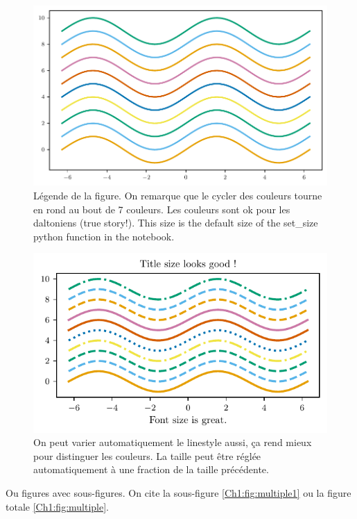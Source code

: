 \begin{figure}
	\centering
	\includegraphics{../Chap1/Figure/Figure_simple_largeur_max.pdf}
	\caption{Légende de la figure. On remarque que le cycler des couleurs tourne en rond au bout de 7 couleurs. Les couleurs sont ok pour les daltoniens (true story!). This size is the default size of the set\_size python function in the notebook.}
	\label{Ch1:fig:simple}
\end{figure}

\begin{figure}
	\centering
	\includegraphics{../Chap1/Figure/Figure_simple_fraction.pdf}
	\caption{On peut varier automatiquement le linestyle aussi, ça rend mieux pour distinguer les couleurs. La taille peut être réglée automatiquement à une fraction de la taille précédente.}
	\label{Ch1:fig:simple frac}
\end{figure}

Ou figures avec sous-figures. On cite la sous-figure \ref{Ch1:fig:multiple1} ou la figure totale \ref{Ch1:fig:multiple}.

